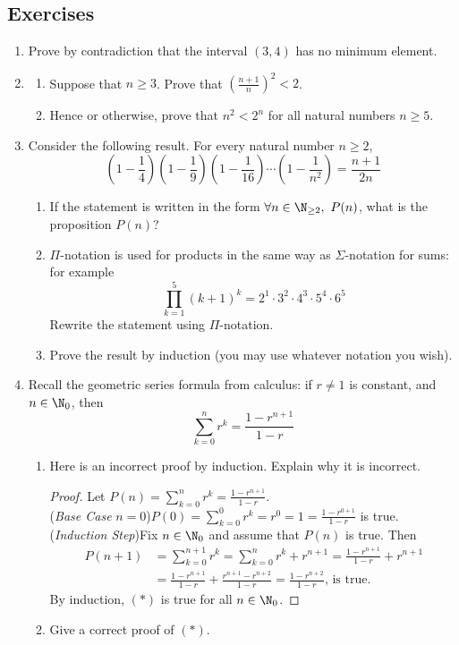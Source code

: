 \subsection*{Exercises}

\begin{enumerate}\renewcommand{\labelenumi}{\thesubsection.\theenumi}
  \item Prove by contradiction that the interval $(3,4)$ has no minimum element.
  
  \item\begin{enumerate}
    \item Suppose that $n\ge 3$. Prove that $\left(\frac{n+1}n\right)^2<2$.
    \item Hence or otherwise, prove that $n^2<2^n$ for all natural numbers $n\ge 5$.
  \end{enumerate}

  \item Consider the following result. For every natural number $n\ge 2$,
	\[\left(1-\frac{1}{4}\right) \left(1-\frac{1}{9}\right) \left(1-\frac{1}{16}\right) \cdots \left(1-\frac{1}{n^2}\right) = \frac{n+1}{2n}\]
  \begin{enumerate}
    \item If the statement is written in the form $\forall n\in\N_{\ge 2},\ P(n)$, what is the proposition $P(n)$?
    \item $\Pi$-notation is used for products in the same way as $\Sigma$-notation for sums: for example
    \[\prod_{k=1}^5(k+1)^k=2^1\cdot 3^2\cdot 4^3\cdot 5^4\cdot 6^5\]
    Rewrite the statement using $\Pi$-notation.
    \item Prove the result by induction (you may use whatever notation you wish).
  \end{enumerate}\pagebreak[2]
	
	\item Recall the geometric series formula from calculus: if $r\neq 1$ is constant, and $n\in\N_0$, then
	\[\sum_{k=0}^nr^k=\frac{1-r^{n+1}}{1-r}\tag*{$(\ast)$}\]
	\begin{enumerate}
	  \item Here is an incorrect proof by induction. Explain why it is incorrect.
	  \begin{proof}
	  Let $P(n)=\sum\limits_{k=0}^nr^k=\frac{1-r^{n+1}}{1-r}$.\\
	  (\emph{Base Case} $n=0$)\quad $P(0)=\sum\limits_{k=0}^0r^k=r^0=1=\frac{1-r^{0+1}}{1-r}$ is true.\\
	  (\emph{Induction Step})\quad Fix $n\in\N_0$ and assume that $P(n)$ is true. Then
	  \begin{align*}
	  P(n+1)&=\sum_{k=0}^{n+1}r^k=\sum_{k=0}^nr^k+r^{n+1}=\frac{1-r^{n+1}}{1-r}+r^{n+1}\\
	  &=\frac{1-r^{n+1}}{1-r}+\frac{r^{n+1}-r^{n+2}}{1-r}=\frac{1-r^{n+2}}{1-r}\text{, \ is true.}
	  \end{align*}
	  By induction, $(\ast)$ is true for all $n\in\N_0$.
	  \end{proof}
	  \item Give a correct proof of $(\ast)$.
	\end{enumerate}
	

\end{enumerate}
